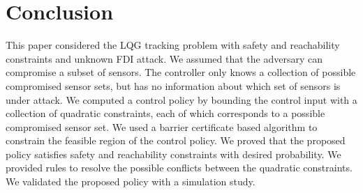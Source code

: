 \documentclass[journal]{IEEEtran}
\begin{document}
\section{Conclusion}
\label{sec:conclusion}
This paper considered the LQG tracking problem with safety and reachability constraints and unknown FDI attack. We assumed that the adversary can compromise a subset of sensors. The controller only knows a collection of possible compromised sensor sets, but has no information about which set of sensors is under attack. We computed a control policy by bounding the control input with a collection of quadratic constraints, each of which corresponds to a possible compromised sensor set. We used a barrier certificate based algorithm to constrain the feasible region of the control policy. We proved that the proposed policy satisfies safety and reachability constraints with desired probability. We provided rules to resolve the possible conflicts between the quadratic constraints. We validated the proposed policy with a simulation study.
\end{document}
